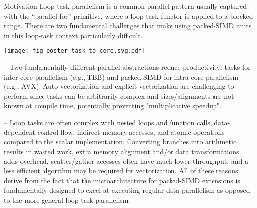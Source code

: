 \documentclass{cbxposter}
\begin{document}
\begin{frame}[fragile,t]{}
\begin{columns}[T]
\begin{column}{10.5in}
\begin{block}{Motivation}
  Loop-task parallelism is a common parallel pattern usually captured with
  the “parallel for” primitive, where a loop task functor is applied to a
  blocked range. There are two fundamental challenges that make using
  packed-SIMD units in this loop-task context particularly difficult.


  \vspace{0.5in}
  \begin{center}
  \texttt{[image: fig-poster-task-to-core.svg.pdf]}
  \end{center}
  \vspace{0.5in}

  \begin{cbxlist}{2em}{1.5em}{0em}
    \raggedright

    \item {} -- Two fundamentally
       different parallel abstractions reduce productivity: tasks for
       inter-core parallelism (e.g., TBB) and packed-SIMD for intra-core
       parallelism (e.g., AVX). Auto-vectorization and explicit
       vectorization are challenging to perform since tasks can be
       arbitrarily complex and sizes/alignments are not known at compile
       time, potentially preventing "multiplicative speedup".

    \vspace{0.3in}

    \item {} -- Loop tasks are
       often complex with nested loops and function calls, data-dependent
       control flow, indirect memory accesses, and atomic operations
       compared to the scalar implementation. Converting branches into
       arithmetic results in wasted work, extra memory alignment and/or
       data transformations adds overhead, scatter/gather accesses often
       have much lower throughput, and a less efficient algorithm may be
       required for vectorization. All of these reasons derive from the
       fact that the microarchitecture for packed-SIMD extensions is
       fundamentally designed to excel at executing regular data
       parallelism as opposed to the more general loop-task parallelism.
  \end{cbxlist}


\end{block}
\end{column}
\end{columns}
\end{frame}
\end{document}
